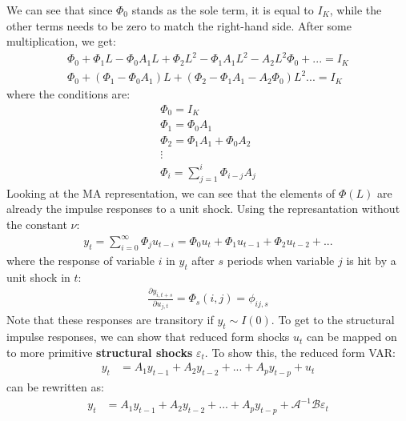 \documentclass[a4paper, 12pt]{article}
\begin{document}
We can see that since $\Phi_0$ stands as the sole term, it is equal to $I_K$, while the other terms needs to be zero to match the right-hand side.
After some multiplication, we get:
\begin{equation}
\begin{aligned}
\Phi_0+\Phi_1L-\Phi_0A_1L+\Phi_2 L^2-\Phi_1 A_1 L^2-A_2 L^2\Phi_0+...=I_K \nonumber \\
\Phi_0+(\Phi_1-\Phi_0A_1)L+(\Phi_2-\Phi_1 A_1-A_2\Phi_0)L^2...=I_K
\end{aligned}
\end{equation} 
where the conditions are:
\begin{equation}
\begin{aligned}
\Phi_0=I_K \nonumber \\
\Phi_1=\Phi_0 A_1 \\
\Phi_2=\Phi_1 A_1+\Phi_0A_2\\
\vdots \\
\Phi_i=\sum_{j=1}^i\Phi_{i-j}A_j
\end{aligned}
\end{equation}
Looking at the MA representation, we can see that the elements of $\Phi(L)$ are already the impulse responses to a unit shock. Using the represantation without the constant $\nu$:
\begin{equation}
\begin{aligned}
y_t=\sum_{i=0}^\infty\Phi_ju_{t-i}=\Phi_0 u_t+\Phi_1 u_{t-1}+\Phi_2 u_{t-2}+...\nonumber
\end{aligned}
\end{equation}
where the response of variable $i$ in $y_t$ after $s$ periods when variable $j$ is hit by a unit shock in $t$:
\begin{equation}
\begin{aligned}
\frac{\partial y_{i,t+s}}{\partial u_{j,t}}=\Phi_s(i,j)=\phi_{ij,s} \nonumber
\end{aligned}
\end{equation}
Note that these responses are transitory if $y_t\sim I(0)$. To get to the structural impulse responses, we can show that reduced form shocks $u_t$ can be mapped on to more primitive \textbf{structural shocks} $\varepsilon_t$. To show this, the reduced form VAR:
\begin{equation}
\begin{aligned}
y_{t} &=A_1 y_{t-1}+A_2 y_{t-2}+...+A_p y_{t-p}+u_t \nonumber
\end{aligned}
\end{equation}
can be rewritten as: 
\begin{equation}
\begin{aligned}
y_{t} &=A_1 y_{t-1}+A_2 y_{t-2}+...+A_p y_{t-p}+\mathcal{A}^{-1}\mathcal{B}\varepsilon_t \nonumber
\end{aligned}
\end{equation}
\end{document}
